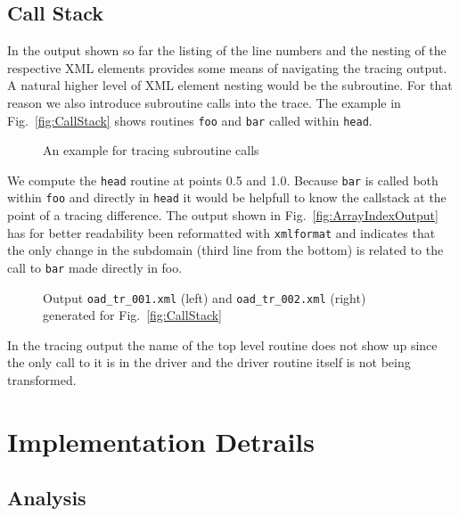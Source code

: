 \documentclass{article}
\newcommand{\reffig}[1]{{Fig.~\ref{#1}}}
\begin{document}
\subsection{Call Stack}
In the output shown so far the listing of the line numbers and the 
nesting of the respective XML elements provides some means of navigating the 
tracing output. A natural higher level of XML element nesting would be 
the subroutine. For that reason we also introduce subroutine calls into the trace. 
The example in \reffig{fig:CallStack} shows routines \lstinline{foo} and \lstinline{bar}
called within \lstinline{head}.
\begin{figure}

\caption{An example for tracing subroutine calls}\label{fig:ArrayIndex} 
\end{figure} 
We compute the \lstinline{head} routine at points 0.5 and 1.0. Because \lstinline{bar} 
is called both within \lstinline{foo} and directly in \lstinline{head} it would be 
helpfull to know the callstack at the point of a tracing difference. 
The output shown in \reffig{fig:ArrayIndexOutput} has for better readability 
been reformatted with \lstinline{xmlformat} \cite{xmlformat} and 
indicates that the only change in the subdomain (third line from the bottom)
is related to the call to \lstinline{bar} made directly in foo.
\begin{figure}
\begin{minipage}{.5\textwidth}
\scriptsize
{}
\end{minipage}
\begin{minipage}{.5\textwidth}
\scriptsize
{}
\end{minipage}
\caption{Output \lstinline{oad_tr_001.xml} (left) 
and \lstinline{oad_tr_002.xml} (right) 
generated for \reffig{fig:CallStack}}\label{fig:CallStackOutput}
\end{figure}
In the tracing output the name of the top level routine does not show up 
since the only call to it is in the driver and the driver routine itself is not being transformed.
\section{Implementation Detrails}\label{sec:implementation}
\subsection{Analysis}\label{sec:analysis}
 
\end{document}
